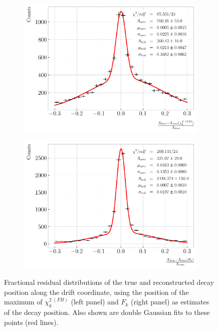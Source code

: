 \begin{figure}[t]
	\begin{subfigure}{0.5\textwidth}
		\centering
		\includegraphics[width=.99\linewidth]{Images/GArSoft_PID/pion_decay/pion_decay_resolution_chisqfb.pdf}
	\end{subfigure}
	\begin{subfigure}{0.5\textwidth}
		\centering
		\includegraphics[width=.99\linewidth]{Images/GArSoft_PID/pion_decay/pion_decay_resolution_fisher.pdf}
	\end{subfigure}
	\caption{Fractional residual distributions of the true and reconstructed decay position along the drift coordinate, using the position of the maximum of $\chi^{2 \ (FB)}_{k}$ (left panel) and $F_{k}$ (right panel) as estimates of the decay position. Also shown are double Gaussian fits to these points (red lines).}
	\label{fig:pion_decay_resolution}
\end{figure}

